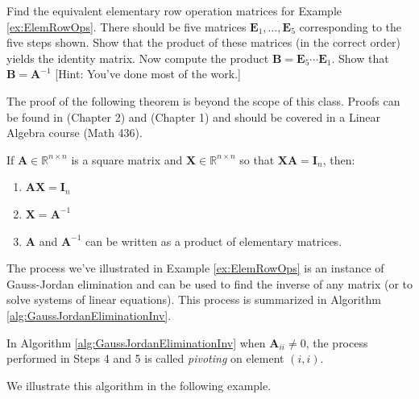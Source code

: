 \begin{exercise} Find the equivalent elementary row operation matrices for Example \ref{ex:ElemRowOps}. There should be five matrices $\mathbf{E}_1, \dots, \mathbf{E}_5$ corresponding to the five steps shown. Show that the product of these matrices (in the correct order) yields the identity matrix. Now compute the product $\mathbf{B} = \mathbf{E}_5\cdots\mathbf{E}_1$. Show that $\mathbf{B} = \mathbf{A}^{-1}$ [Hint: You've done most of the work.]
\label{exer:MatrixInv1}
\end{exercise}

The proof of the following theorem is beyond the scope of this class. Proofs can be found in \cite{Str87} (Chapter 2) and \cite{Cull72} (Chapter 1) and should be covered in a Linear Algebra course (Math 436). 
\begin{theorem} If $\mathbf{A} \in \mathbb{R}^{n \times n}$ is a square matrix and $\mathbf{X} \in \mathbb{R}^{n \times n}$ so that $\mathbf{X}\mathbf{A} = \mathbf{I}_n$, then:
\begin{enumerate}
\item $\mathbf{A}\mathbf{X} = \mathbf{I}_n$
\item $\mathbf{X} = \mathbf{A}^{-1}$
\item $\mathbf{A}$ and $\mathbf{A}^{-1}$ can be written as a product of elementary matrices.
\end{enumerate}
\end{theorem}

The process we've illustrated in Example \ref{ex:ElemRowOps} is an instance of Gauss-Jordan elimination and can be used to find the inverse of any matrix (or to solve systems of linear equations). This process is summarized in Algorithm \ref{alg:GaussJordanEliminationInv}. 
\begin{definition}[Pivoting]
In Algorithm \ref{alg:GaussJordanEliminationInv} when $\mathbf{A}_{ii} \neq 0$, the process performed in Steps 4 and 5 is called \textit{pivoting} on element $(i,i)$.
\end{definition}
We illustrate this algorithm in the following example.

